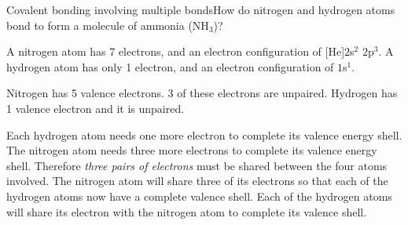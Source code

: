 \begin{wex}{Covalent bonding involving multiple bonds}{How do nitrogen and hydrogen atoms bond to form a molecule of ammonia (NH$_{3}$)?\\}
{

A nitrogen atom has 7 electrons, and an electron configuration of [He]$2$s$^{2}$ $2$p$^{3}$. A hydrogen atom has only 1 electron, and an electron configuration of $1$s$^{1}$.


Nitrogen has 5 valence electrons. 3 of these electrons are unpaired. Hydrogen has 1 valence electron and it is unpaired.


Each hydrogen atom needs one more electron to complete its valence energy shell. The nitrogen atom needs three more electrons to complete its valence energy shell. Therefore \textit{three pairs of electrons} must be shared between the four atoms involved. The nitrogen atom will share three of its electrons so that each of the hydrogen atoms now have a complete valence shell. Each of the hydrogen atoms will share its electron with the nitrogen atom to complete its valence shell.

\begin{figure}[H]
\end{figure}}
\end{wex}
